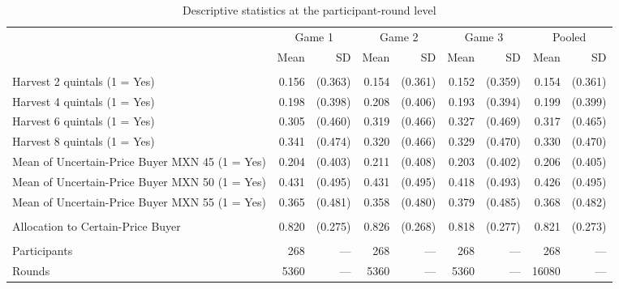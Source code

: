 \begin{table}[t]
\caption{Descriptive statistics at the participant-round level\label{tab:descriptive_participant_round}} 

\begin{tabular*}{\linewidth}{@{\extracolsep{\fill}}lrrrrrrrr}
\toprule
 & \multicolumn{2}{c}{{Game 1}} & \multicolumn{2}{c}{{Game 2}} & \multicolumn{2}{c}{{Game 3}} & \multicolumn{2}{c}{{Pooled}} \\ 
\cmidrule(lr){2-3} \cmidrule(lr){4-5} \cmidrule(lr){6-7} \cmidrule(lr){8-9}
 & Mean & SD & Mean & SD & Mean & SD & Mean & SD \\ 
\midrule\addlinespace[2.5pt]
\multicolumn{9}{l}{Experimental Variables} \\[2.5pt] 
\midrule\addlinespace[2.5pt]
Harvest 2 quintals (1 = Yes) & 0.156 & (0.363) & 0.154 & (0.361) & 0.152 & (0.359) & 0.154 & (0.361) \\ 
Harvest 4 quintals (1 = Yes) & 0.198 & (0.398) & 0.208 & (0.406) & 0.193 & (0.394) & 0.199 & (0.399) \\ 
Harvest 6 quintals (1 = Yes) & 0.305 & (0.460) & 0.319 & (0.466) & 0.327 & (0.469) & 0.317 & (0.465) \\ 
Harvest 8 quintals (1 = Yes) & 0.341 & (0.474) & 0.320 & (0.466) & 0.329 & (0.470) & 0.330 & (0.470) \\ 
Mean of Uncertain-Price Buyer MXN 45 (1 = Yes) & 0.204 & (0.403) & 0.211 & (0.408) & 0.203 & (0.402) & 0.206 & (0.405) \\ 
Mean of Uncertain-Price Buyer MXN 50 (1 = Yes) & 0.431 & (0.495) & 0.431 & (0.495) & 0.418 & (0.493) & 0.426 & (0.495) \\ 
Mean of Uncertain-Price Buyer MXN 55 (1 = Yes) & 0.365 & (0.481) & 0.358 & (0.480) & 0.379 & (0.485) & 0.368 & (0.482) \\ 
\midrule\addlinespace[2.5pt]
\multicolumn{9}{l}{Outcome of Interest} \\[2.5pt] 
\midrule\addlinespace[2.5pt]
Allocation to Certain-Price Buyer & 0.820 & (0.275) & 0.826 & (0.268) & 0.818 & (0.277) & 0.821 & (0.273) \\ 
\midrule\addlinespace[2.5pt]
\multicolumn{9}{l}{Observations} \\[2.5pt] 
\midrule\addlinespace[2.5pt]
Participants & 268 & — & 268 & — & 268 & — & 268 & — \\ 
Rounds & 5360 & — & 5360 & — & 5360 & — & 16080 & — \\ 
\bottomrule
\end{tabular*}
\end{table}

